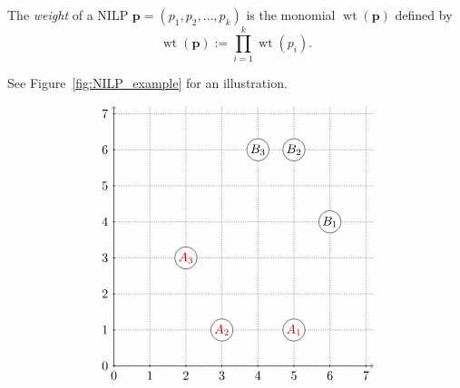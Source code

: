\documentclass[reqno]{amsart}
\newcommand{\0}{\phantom{c}}
\DeclareMathOperator{\wt}{wt} %
\newcommand{\pp}{\mathbf{p}}
\let\prodnonlimits\prod
\renewcommand{\prod}{\prodnonlimits\limits}
\newcommand{\tup}[1]{\left( #1 \right)}
\newcommand{\defn}[1]{{\color{darkred}\emph{#1}}} %
\theoremstyle{plain}
\theoremstyle{definition}
\numberwithin{equation}{section}
\begin{document}
The \defn{weight} of a NILP $\pp = \tup{p_1, p_2, \dotsc, p_k}$ is the monomial $\wt(\pp)$ defined by
\[
\wt(\pp) := \prod_{i=1}^{k} \wt(p_i).
\]

See Figure~\ref{fig:NILP_example} for an illustration.

\begin{figure}[t]
\[
\begin{tikzpicture}
  \draw[densely dotted] (0,0) grid (7.2,7.2);
  \draw[->] (0,0) -- (0,7.2);
  \draw[->] (0,0) -- (7.2,0);
  \foreach \x/\xtext in {0, 1, 2, 3, 4, 5, 6, 7}
     \draw (\x cm,1pt) -- (\x cm,-1pt) node[anchor=north] {$\xtext$};
  \foreach \y/\ytext in {0, 1, 2, 3, 4, 5, 6, 7}
     \draw (1pt,\y cm) -- (-1pt,\y cm) node[anchor=east] {$\ytext$};

  \node[circle,fill=white,draw=black,text=darkred,inner sep=1pt] (A3) at (2,3) {$A_3$};
  \node[circle,fill=white,draw=black,text=darkred,inner sep=1pt] (A2) at (3,1) {$A_2$};
  \node[circle,fill=white,draw=black,text=darkred,inner sep=1pt] (A1) at (5,1) {$A_1$};

  \node[circle,fill=white,draw=black,text=black,inner sep=1pt] (B3) at (4,6) {$B_3$};
  \node[circle,fill=white,draw=black,text=black,inner sep=1pt] (B2) at (5,6) {$B_2$};
  \node[circle,fill=white,draw=black,text=black,inner sep=1pt] (B1) at (6,4) {$B_1$};


\end{tikzpicture}\]
\end{figure}
\end{document}
